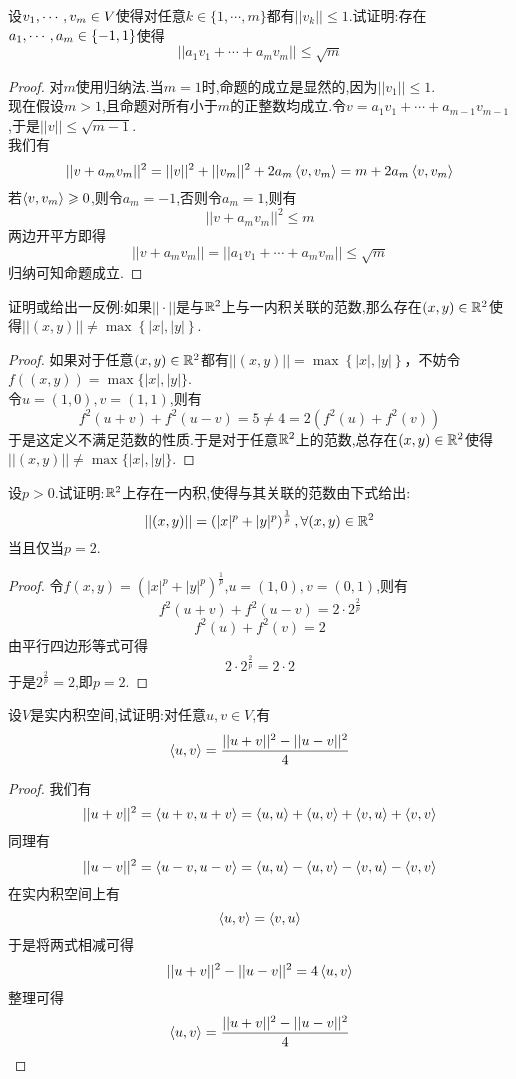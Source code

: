 \documentclass{ctexart}
\begin{document}
\begin{problem}[23.]
    设${v}_1,\cdots,{v}_{m}\in V$使得对任意$k\in\{1,\cdots,m\}$都有$||v_k||\leqslant1$.试证明:存在${a}_1,\cdots,{a}_{m}\in\{-1,1\}$使得
    \[||a_1v_1+\cdots+a_mv_m||\leqslant\sqrt m\]
\end{problem}
\begin{proof}
    对$m$使用归纳法.当$m=1$时,命题的成立是显然的,因为$||v_1||\leqslant1$.\\
    现在假设$m>1$,且命题对所有小于$m$的正整数均成立.令$v=a_1v_1+\cdots+a_{m-1}v_{m-1}$,于是$||v||\leqslant\sqrt{m-1}$.\\
    我们有
    \[||v+a_mv_m||^2=||v||^2+||v_m||^2+2a_m\left\langle{v},{v_m}\right\rangle=m+2a_m\left\langle{v},{v_m}\right\rangle\]
    若$\left\langle{v},{v_m}\right\rangle\geqslant0$,则令$a_m=-1$,否则令$a_m=1$,则有
    \[||v+a_mv_m||^2\leqslant m\]
    两边开平方即得
    \[||v+a_mv_m||=||a_1v_1+\cdots+a_mv_m||\leqslant\sqrt{m}\]
    归纳可知命题成立.
\end{proof}
\begin{problem}[24.]
    证明或给出一反例:如果$||\cdot||$是与$\mathbb{R}^2$上与一内积关联的范数,那么存在$(x,y)\in\mathbb{R}^2$使得$||(x,y)||\neq\max\left\{|x|,|y|\right\}$.
\end{problem}
\begin{proof}
    如果对于任意$(x,y)\in\mathbb{R}^2$都有$||(x,y)||=\max\left\{|x|,|y|\right\}$，不妨令$f((x,y))=\max\{|x|,|y|\}$.\\
    令$u=(1,0),v=(1,1)$,则有
    \[f^2(u+v)+f^2(u-v)=5\neq4=2\left(f^2(u)+f^2(v)\right)\]
    于是这定义不满足范数的性质.于是对于任意$\mathbb{R}^2$上的范数,总存在$(x,y)\in\mathbb{R}^2$使得$||(x,y)||\neq\max\{|x|,|y|\}$.
\end{proof}
\begin{problem}[25.]
    设$p>0$.试证明:$\mathbb{R}^2$上存在一内积,使得与其关联的范数由下式给出:
    \[||(x,y)||=\left(|x|^p+|y|^p\right)^{\frac 1p},\forall(x,y)\in\mathbb{R}^2\]
    当且仅当$p=2$.
\end{problem}
\begin{proof}
    令$f(x,y)=\left(|x|^p+|y|^p\right)^{\frac 1p}$,$u=(1,0),v=(0,1)$,则有
    \[f^2(u+v)+f^2(u-v)=2\cdot2^{\frac 2p}\]
    \[f^2(u)+f^2(v)=2\]
    由平行四边形等式可得
    \[2\cdot2^{\frac{2}{p}}=2\cdot 2\]
    于是$2^{\frac 2p}=2$,即$p=2$.
\end{proof}
\begin{problem}[26.]
    设$V$是实内积空间,试证明:对任意$u,v\in V$,有
    \[\left\langle{u},{v}\right\rangle=\dfrac{||u+v||^2-||u-v||^2}{4}\]
\end{problem}
\begin{proof}
    我们有
    \[||u+v||^2=\left\langle{u+v},{u+v}\right\rangle=\left\langle{u},{u}\right\rangle+\left\langle{u},{v}\right\rangle+\left\langle{v},{u}\right\rangle+\left\langle{v},{v}\right\rangle\]
    同理有
    \[||u-v||^2=\left\langle{u-v},{u-v}\right\rangle=\left\langle{u},{u}\right\rangle-\left\langle{u},{v}\right\rangle-\left\langle{v},{u}\right\rangle-\left\langle{v},{v}\right\rangle\]
    在实内积空间上有
    \[\left\langle{u},{v}\right\rangle=\left\langle{v},{u}\right\rangle\]
    于是将两式相减可得
    \[||u+v||^2-||u-v||^2=4\left\langle{u},{v}\right\rangle\]
    整理可得
    \[\left\langle{u},{v}\right\rangle=\dfrac{||u+v||^2-||u-v||^2}{4}\]
\end{proof}
\end{document}
